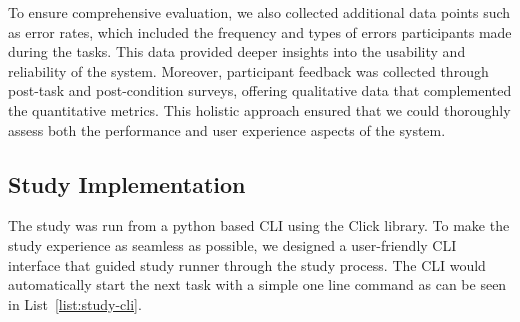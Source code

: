 To ensure comprehensive evaluation, we also collected additional data points such as error rates, which included the frequency and types of errors participants made during the tasks. This data provided deeper insights into the usability and reliability of the system. Moreover, participant feedback was collected through post-task and post-condition surveys, offering qualitative data that complemented the quantitative metrics. This holistic approach ensured that we could thoroughly assess both the performance and user experience aspects of the system.

\subsection{Study Implementation}

The study was run from a python based CLI using the Click \cite{noauthor_palletsclick_2024} library. To make the study experience as seamless as possible, we designed a user-friendly CLI interface that guided study runner through the study process. The CLI would automatically start the next task with a simple one line command as can be seen in List~\ref{list:study-cli}.

